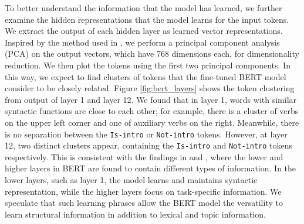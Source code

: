 To better understand the information that the model has learned, we further examine the hidden representations that the model learns for the input tokens. We extract the output of each hidden layer as learned vector representations. Inspired by the method used in \cite{van2019does}, we perform a principal component analysis (PCA) on the output vectors, which have 768 dimensions each, for dimensionality reduction. We then plot the tokens using the first two principal components. In this way, we expect to find clusters of tokens that the fine-tuned BERT model consider to be closely related. Figure \ref{fig:bert_layers} shows the token clustering from output of layer 1 and layer 12. We found that in layer 1, words with similar syntactic functions are close to each other; for example, there is a cluster of verbs on the upper left corner and one of auxiliary verbs on the right. Meanwhile, there is no separation between the \texttt{Is-intro} or \texttt{Not-intro} tokens. However, at layer 12, two distinct clusters appear, containing the \texttt{Is-intro} and \texttt{Not-intro} tokens respectively. This is consistent with the findings in \citet{van2019does} and \citet{tenney2019bert}, where the lower and higher layers in BERT are found to contain different types of information. In the lower layers, such as layer 1, the model learns and maintains syntactic representation, while the higher layers focus on task-specific information. We speculate that such learning phrases allow the BERT model the versatility to learn structural information in addition to lexical and topic information.


